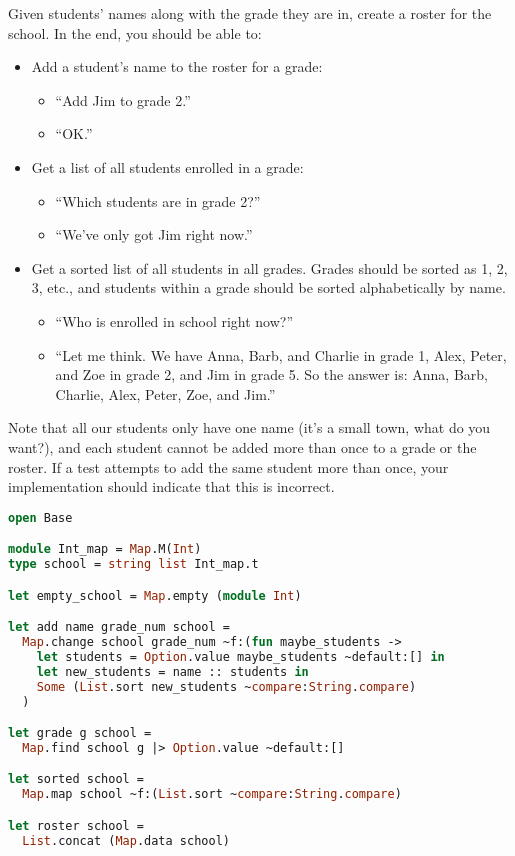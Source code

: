 Given students' names along with the grade they are in, create a roster for the school.
In the end, you should be able to:
\begin{itemize}
  \item Add a student's name to the roster for a grade:
        \begin{itemize}
          \item ``Add Jim to grade 2.''
          \item ``OK.''
        \end{itemize}
  \item Get a list of all students enrolled in a grade:
        \begin{itemize}
          \item ``Which students are in grade 2?''
          \item ``We've only got Jim right now.''
        \end{itemize}
  \item Get a sorted list of all students in all grades.
        Grades should be sorted as 1, 2, 3, etc., and students within a grade should be sorted alphabetically by name.
        \begin{itemize}
          \item ``Who is enrolled in school right now?''
          \item ``Let me think.
                We have Anna, Barb, and Charlie in grade 1, Alex, Peter, and Zoe in grade 2, and Jim in grade 5.
                So the answer is: Anna, Barb, Charlie, Alex, Peter, Zoe, and Jim.''
        \end{itemize}
\end{itemize}
Note that all our students only have one name (it's a small town, what do you want?), and each student cannot be added more than once to a grade or the roster.
If a test attempts to add the same student more than once, your implementation should indicate that this is incorrect.

\begin{lstlisting}[language=OCaml]
open Base

module Int_map = Map.M(Int)
type school = string list Int_map.t

let empty_school = Map.empty (module Int)

let add name grade_num school =
  Map.change school grade_num ~f:(fun maybe_students ->
    let students = Option.value maybe_students ~default:[] in
    let new_students = name :: students in
    Some (List.sort new_students ~compare:String.compare)
  )

let grade g school =
  Map.find school g |> Option.value ~default:[]

let sorted school =
  Map.map school ~f:(List.sort ~compare:String.compare)

let roster school =
  List.concat (Map.data school)
\end{lstlisting}

